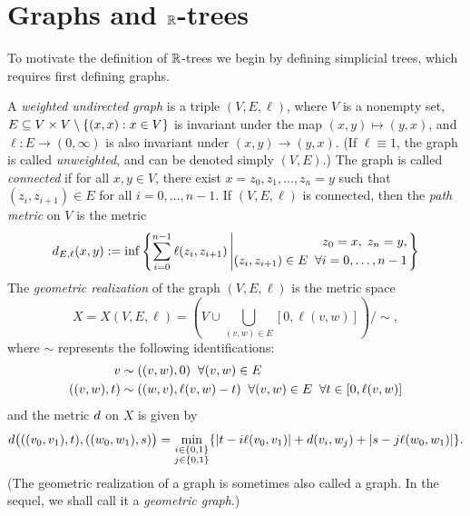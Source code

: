 \bigskip
\section{Graphs and $\R$-trees}
\label{subsectiongraphs}

To motivate the definition of $\R$-trees we begin by defining simplicial trees, which requires first defining graphs.

\begin{definition}
\label{definitiongraphmetrization}
A \emph{weighted undirected graph} is a triple $(V,E,\ell)$, where $V$ is a nonempty set, $E\subseteq V\times V\setminus\{(x,x) : x\in V\}$ is invariant under the map $(x,y)\mapsto (y,x)$, and $\ell:E\to(0,\infty)$ is also invariant under $(x,y)\to (y,x)$. (If $\ell \equiv 1$, the graph is called \emph{unweighted}, and can be denoted simply $(V,E)$.) The graph is called \emph{connected} if for all $x,y\in V$, there exist $x = z_0,z_1,\ldots,z_n = y$ such that $(z_i,z_{i + 1}) \in E$ for all $i = 0,\ldots,n - 1$. If $(V,E,\ell)$ is connected, then the \emph{path metric} on $V$ is the metric
\begin{equation}
\label{pathmetric}
d_{E,\ell}(x,y) := \inf\left\{ \sum_{i = 0}^{n - 1} \ell(z_i,z_{i + 1}) \left|
\begin{split}
z_0 = x,\; z_n = y,\\
(z_i,z_{i + 1})\in E \;\;\forall i = 0,\ldots,n - 1
\end{split}
\right.
\right\}
\end{equation}
The \emph{geometric realization} of the graph $(V,E,\ell)$ is the metric space
\[
X = X(V,E,\ell) = \left(V\cup\bigcup_{(v,w)\in E} [0,\ell(v,w)]\right)/\sim,
\]
where $\sim$ represents the following identifications:
\begin{align*}
v &\sim ((v,w),0) \;\;\forall (v,w)\in E\\
((v,w),t) &\sim ((w,v),\ell(v,w) - t) \;\;\forall (v,w)\in E \;\;\forall t\in[0,\ell(v,w)]
\end{align*}
and the metric $d$ on $X$ is given by
\[
d\big(((v_0,v_1),t),((w_0,w_1),s)\big) = \min_{\substack{i\in\{0,1\}\\ j\in \{0,1\}}}\{ |t - i\ell(v_0,v_1)| + d(v_i,w_j) + |s - j\ell(w_0,w_1)|\}.
\]
(The geometric realization of a graph is sometimes also called a graph. In the sequel, we shall call it a \emph{geometric graph}.)
\end{definition}

